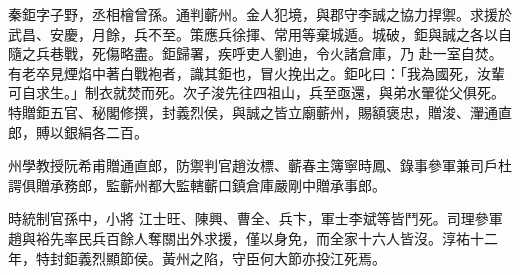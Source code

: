\begin{pinyinscope}
 秦鉅字子野，丞相檜曾孫。通判蘄州。金人犯境，與郡守李誠之協力捍禦。求援於武昌、安慶，月餘，兵不至。策應兵徐揮、常用等棄城遁。城破，鉅與誠之各以自隨之兵巷戰，死傷略盡。鉅歸署，疾呼吏人劉迪，令火諸倉庫，乃
 赴一室自焚。有老卒見煙焰中著白戰袍者，識其鉅也，冒火挽出之。鉅叱曰：「我為國死，汝輩可自求生。」制衣就焚而死。次子浚先往四祖山，兵至亟還，與弟水翬從父俱死。特贈鉅五官、秘閣修撰，封義烈侯，與誠之皆立廟蘄州，賜額褒忠，贈浚、瀈通直郎，賻以銀絹各二百。



 州學教授阮希甫贈通直郎，防禦判官趙汝標、蘄春主簿寧時鳳、錄事參軍兼司戶杜諤俱贈承務郎，監蘄州都大監轄蘄口鎮倉庫嚴剛中贈承事郎。



 時統制官孫中，小將
 江士旺、陳興、曹全、兵卞，軍士李斌等皆鬥死。司理參軍趙與裕先率民兵百餘人奪關出外求援，僅以身免，而全家十六人皆沒。淳祐十二年，特封鉅義烈顯節侯。黃州之陷，守臣何大節亦投江死焉。



\end{pinyinscope}